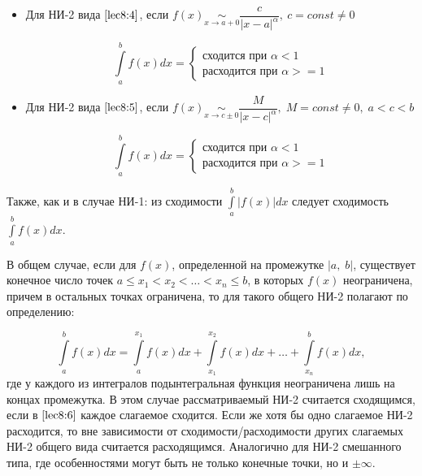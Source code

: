 \documentclass[../../main.tex]{subfiles}
\begin{document}
\begin{enumerate}
\begin{itemize}
\item Для НИ-2 вида $\eqref{lec8:4}$, если $f(x) \underset{x \to a + 0}\sim 
\dfrac{c}{\left|x - a\right|^{\alpha}}, \ c = const \neq 0$

\[\int\limits_{a}^{b}f(x)dx = \begin{cases}
                               \text{сходится при } \alpha < 1\\
                               \text{расходится при } \alpha >= 1
                              \end{cases}
\]                                                    
                                                    
\item Для НИ-2 вида $\eqref{lec8:5}$, если $f(x) \underset{x \to c \pm 
0}\sim \dfrac{M}{\left|x - c\right|^{\alpha}}, \; M = const \neq 0,\; a < c < 
b$

\[\int\limits_{a}^{b}f(x)dx = \begin{cases}
                               \text{сходится при } \alpha < 1\\
                               \text{расходится при } \alpha >= 1
                              \end{cases}
\]
 \end{itemize}
\end{enumerate}


Также, как и в случае НИ-1: из сходимости 
$\displaystyle\int\limits_{a}^{b}\left|f(x)\right|dx$ следует сходимость 
$\displaystyle\int\limits_{a}^{b}f(x)dx$.

В общем случае, если для $f(x)$, определенной на промежутке $\left|a, \; 
b\right|$, существует конечное число точек $a \leq x_1 < x_2 < \ldots < x_n 
\leq b$, в которых $f(x)$ неограничена, причем в остальных точках 
ограничена, то для такого общего НИ-2 полагают по определению:

\begin{equation} \label{lec8:6}
\int\limits_{a}^{b}f(x)dx = \int\limits_{a}^{x_1}f(x)dx + 
\int\limits_{x_1}^{x_2}f(x)dx + \ldots + \int\limits_{x_n}^{b}f(x)dx,
\end{equation}
где у каждого из интегралов подынтегральная функция неограничена лишь на 
концах промежутка. В этом случае рассматриваемый НИ-2 считается сходящимся, 
если в $\eqref{lec8:6}$ каждое слагаемое сходится. Если же хотя бы одно 
слагаемое НИ-2 расходится, то вне зависимости от сходимости/расходимости 
других слагаемых НИ-2 общего вида считается расходящимся. Аналогично для НИ-2 
смешанного типа, где особенностями могут быть не только конечные точки, но и $\pm\infty$.
\end{document}
